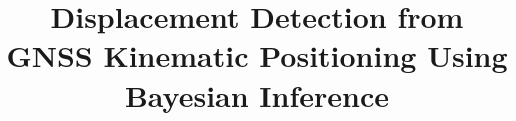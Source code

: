 \documentclass[final,3p,times]{elsarticle}
\begin{document}
	
	\begin{frontmatter}
		
		
		
		\title{\textcolor{r_s}{Displacement Detection from GNSS Kinematic Positioning Using Bayesian Inference}}
		

\end{frontmatter}
\end{document}
